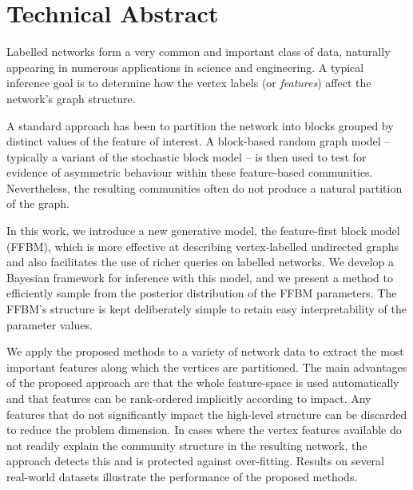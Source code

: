 \section*{Technical Abstract}
Labelled networks form a very common and important class of data,
naturally appearing in numerous applications in science and engineering.
A typical inference goal is to determine how the vertex labels
(or {\em features}) affect the network's graph structure.

A standard approach has been to partition the network into blocks grouped
by distinct values of the feature of interest. A block-based random
graph model -- typically a variant of the stochastic block model --
is then used to test for evidence of asymmetric behaviour within these
feature-based communities. Nevertheless, the resulting communities
often do not produce a natural partition of the graph.

In this work, we introduce a new generative model, the feature-first block model (FFBM),
which is more effective at describing vertex-labelled undirected
graphs and also facilitates the use of richer queries on labelled networks.
We develop a Bayesian framework for inference with this model,
and we present a method to efficiently sample from the posterior
distribution of the FFBM parameters. The FFBM's structure is kept
deliberately simple to retain easy interpretability of the parameter
values.

We apply the proposed methods to a variety of network data
to extract the most important features along which the vertices
are partitioned. The main advantages of the proposed approach are
that the whole feature-space is used automatically and that features
can be rank-ordered implicitly according to impact. Any features
that do not significantly impact the high-level structure can be
discarded to reduce the problem dimension. In cases where the vertex
features available do not readily explain the community structure
in the resulting network, the approach detects this and is protected
against over-fitting. Results on several real-world datasets
illustrate the performance of the proposed methods. 
